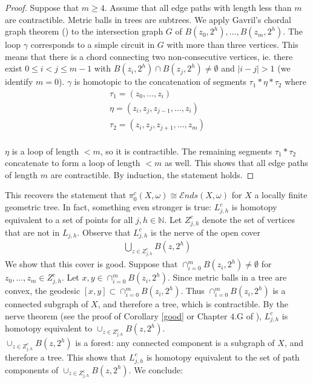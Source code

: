 \documentclass[a4paper,11pt]{article}
\theoremstyle{definition}
\theoremstyle{plain}
\theoremstyle{remark}
\begin{document}
{\begin{proof}
Suppose that $m\geq 4$. Assume that all edge paths with length less than $m$ are contractible. Metric balls in trees are subtrees. We apply Gavril's chordal graph theorem (\cite{gavril1974intersection}) to the intersection graph $G$ of $B(z_0,2^h),\dots, B(z_m, 2^h)$. The loop $\gamma$ corresponds to a simple circuit in $G$ with more than three vertices. This means that there is a chord connecting two non-consecutive vertices, ie. there exist $0\leq i<j\leq m-1$ with $B(z_i,2^h)\cap B(z_j,2^h) \neq \emptyset$ and $|i-j|>1$ (we identify $m=0$). $\gamma$ is homotopic to the concatenation of segments $\tau_{1}\ast \eta \ast \tau_{2}$ where
\begin{align*}
\tau_{1} = (z_0,\dots,z_i)\\
\eta = (z_i, z_j, z_{j-1},\dots, z_i)\\
\tau_{2} = (z_i,z_j,z_{j+1}, \dots, z_m)
\end{align*} \\
$\eta$ is a loop of length $<m$, so it is contractible. The remaining segments $\tau_{1}\ast \tau_{2}$ concatenate to form a loop of length $<m$ as well. This shows that all edge paths of length $m$ are contractible. By induction, the statement holds. 
\end{proof}

This recovers the statement that $\pi_{0}^c(X,\omega)\cong \mathcal{E}nds(X,\omega)$ for $X$ a locally finite geometric tree. In fact, something even stronger is true: $L_{j,h}^c$ is homotopy equivalent to a set of points for all $j,h\in \mathbb{N}$. Let $Z^c_{j,h}$ denote the set of vertices that are not in $L_{j,h}$. Observe that $L_{j,h}^c$ is the nerve of the open cover 
\begin{align*}
\bigcup_{z \in Z^c_{j,h}} B(z,2^h)
\end{align*}
We show that this cover is good. Suppose that $\cap_{i=0}^{m} B(z_{i},2^h) \neq \emptyset$ for $z_{0},\dots, z_{m}\in Z^c_{j,h}$. Let $x,y \in \cap_{i=0}^{m} B(z_{i},2^h)$. Since metric balls in a tree are convex, the geodesic $[x,y]\subset \cap_{i=0}^{m} B(z_{i},2^h)$. Thus $\cap_{i=0}^{m} B(z_{i},2^h)$ is a connected subgraph of $X$, and therefore a tree, which is contractible. By the nerve theorem (see the proof of Corollary \ref{good} or Chapter $4.$G of \cite{hatcher2002algebraic}), $L_{j,h}^c$ is homotopy equivalent to $\cup_{z \in Z^c_{j,h}} B(z,2^h)$. \\

$\cup_{z \in Z^c_{j,h}} B(z,2^h)$ is a forest: any connected component is a subgraph of $X$, and therefore a tree. This shows that  $L_{j,h}^c$ is homotopy equivalent to the set of path components of $\cup_{z \in Z^c_{j,h}} B(z,2^h)$. We conclude: 

}
\end{document}
